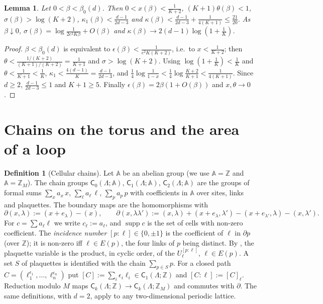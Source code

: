 \documentclass[11pt,a4paper]{article}
\newtheorem{lemma}[theorem]{Lemma}
\theoremstyle{definition}
\newtheorem{definition}[theorem]{Definition}
\theoremstyle{remark}
\DeclareMathOperator{\supp}{supp}
\newcommand{\Z}{\mathbb{Z}}
\newcommand{\sC}{\mathsf{C}}
\newcommand{\bA}{\mathbb{A}}
\newcommand{\Flab}[2]{\cite[#1 \texttt{#2}]{F}}
\begin{document}
\begin{lemma}\label{al:lem:constants}
Let $0<\beta<\beta_0(d)$. Then $0<x(\beta)<\frac1{K+2}$, $(K+1)\theta(\beta)<1$, $\sigma(\beta)>\log(K+2)$,
$\kappa_1(\beta)<\frac{d-1}{2d-3}$ and $\kappa(\beta)<\frac{d-1}{2d-3}+\frac1{4(K+1)}\le\frac{21}{20}$. As
$\beta\downarrow0$, $\sigma(\beta)=\log\frac1{2e^2K\beta}+O(\beta)$ and $\kappa(\beta)\to2(d-1)\log(1+\frac1K)$.
\end{lemma}

\begin{proof}
$\beta<\beta_0(d)$ is equivalent to $\epsilon(\beta)<\frac1{e^2K(K+2)}$, i.e.\ to $x<\frac1{K+2}$; then
$\theta<\frac{1/(K+2)}{(K+1)/(K+2)}=\frac1{K+1}$ and $\sigma>\log(K+2)$. Using $\log(1+\frac1K)<\frac1K$ and
$\theta<\frac1{K+1}<\frac1K$, $\kappa_1<\frac{4(d-1)}K=\frac{d-1}{2d-3}$, and
$\frac14\log\frac1{1-x}<\frac14\log\frac{K+2}{K+1}<\frac1{4(K+1)}$. Since $d\ge2$, $\frac{d-1}{2d-3}\le1$ and
$K+1\ge5$. Finally $\epsilon(\beta)=2\beta(1+O(\beta))$ and $x,\theta\to0$.
\end{proof}

\section{Chains on the torus and the area of a loop}\label{al:sec:chains}

\begin{definition}[Cellular chains]\label{al:def:chains}
Let $\bA$ be an abelian group (we use $\bA=\Z$ and $\bA=\Z_M$). The chain groups $\sC_0(\Lambda;\bA)$,
$\sC_1(\Lambda;\bA)$, $\sC_2(\Lambda;\bA)$ are the groups of formal sums $\sum_x a_x\,x$, $\sum_\ell a_\ell\,\ell$,
$\sum_pa_p\,p$ with coefficients in $\bA$ over sites, links and plaquettes. The boundary maps are the homomorphisms with
\[
\partial(x,\lambda):=(x+e_\lambda)-(x),\qquad
\partial(x,\lambda\lambda'):=(x,\lambda)+(x+e_\lambda,\lambda')-(x+e_{\lambda'},\lambda)-(x,\lambda').
\]
For $c=\sum a_\ell\ell$ we write $c_\ell:=a_\ell$, and $\supp c$ is the set of cells with non-zero coefficient. The
\emph{incidence number} $[p:\ell]\in\{0,\pm1\}$ is the coefficient of $\ell$ in $\partial p$ (over $\Z$); it is non-zero
iff $\ell\in E(p)$, the four links of $p$ being distinct. By \Flab{eq.}{eq:plaquette}, the plaquette variable is the
product, in cyclic order, of the $U_\ell^{[p:\ell]}$, $\ell\in E(p)$. A set $S$ of plaquettes is identified with the
chain $\sum_{p\in S}p$. For a closed path $C=(\ell_1^{\epsilon_1},\dots,\ell_n^{\epsilon_n})$ put
$[C]:=\sum_i\epsilon_i\ell_i\in\sC_1(\Lambda;\Z)$ and $[C:\ell]:=[C]_\ell$. Reduction modulo $M$ maps
$\sC_k(\Lambda;\Z)\to\sC_k(\Lambda;\Z_M)$ and commutes with $\partial$. The same definitions, with $d=2$, apply to any
two-dimensional periodic lattice.
\end{definition}
\end{document}
